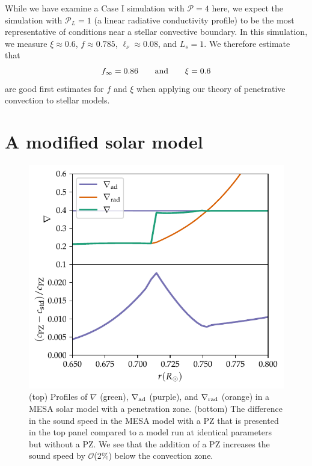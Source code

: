 \documentclass[twocolumn]{aastex631}
\newcommand{\gradrad}{\ensuremath{\nabla_{\rm{rad}}}}
\newcommand{\gradad}{\ensuremath{\nabla_{\rm{ad}}}}
\newcommand{\justgrad}{\ensuremath{\nabla}}
\newcommand{\mP}{\ensuremath{\mathcal{P}}}
\begin{document}
While we have examine a Case I simulation with $\mP = 4$ here, we expect the simulation with $\mP_L = 1$ (a linear radiative conductivity profile) to be the most representative of conditions near a stellar convective boundary.
In this simulation, we measure $\xi \approx 0.6$, $f \approx 0.785$, $\ell_\nu \approx 0.08$, and $L_s = 1$.
We therefore estimate that
\begin{equation}
f_\infty = 0.86\qquad\rm{and}\qquad
\xi = 0.6
\label{eqn:f_xi_estimates}
\end{equation}
are good first estimates for $f$ and $\xi$ when applying our theory of penetrative convection to stellar models.

\section{A modified solar model}
\label{sec:solar_model}

\begin{figure}[t]
\centering
\includegraphics[width=\columnwidth]{mesa_profiles.pdf}
\caption{
(top) Profiles of $\justgrad$ (green), $\gradad$ (purple), and $\gradrad$ (orange) in a MESA solar model with a penetration zone.
(bottom) The difference in the sound speed in the MESA model with a PZ that is presented in the top panel compared to a model run at identical parameters but without a PZ.
We see that the addition of a PZ increases the sound speed by $\mathcal{O}$(2\%) below the convection zone.
\label{fig:mesa_profiles}
}
\end{figure}
\end{document}

